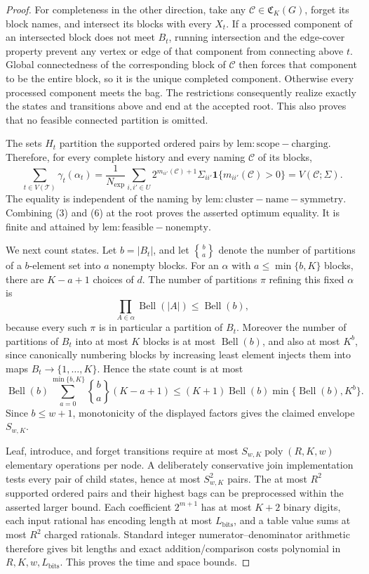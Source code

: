\documentclass{article}
\begin{document}
\begin{proof}
For completeness in the other direction, take any \(\mathcal C\in\mathfrak C_K(G)\), forget its block names, and intersect its blocks with every \(X_t\).  If a processed component of an intersected block does not meet \(B_t\), running intersection and the edge-cover property prevent any vertex or edge of that component from connecting above \(t\).  Global connectedness of the corresponding block of \(\mathcal C\) then forces that component to be the entire block, so it is the unique completed component.  Otherwise every processed component meets the bag.  The restrictions consequently realize exactly the states and transitions above and end at the accepted root.  This also proves that no feasible connected partition is omitted.

The sets \(H_t\) partition the supported ordered pairs by \(\mathrm{lem:scope-charging}\).  Therefore, for every complete history and every naming \(\mathcal C\) of its blocks,
\[
 \sum_{t\in V(\mathcal T)}\gamma_t(\alpha_t)
 =\frac{1}{N_{\exp}}\sum_{i,i'\in U}
 2^{m_{ii'}(\mathcal C)+1}\Sigma_{ii'}
 \mathbf 1\{m_{ii'}(\mathcal C)>0\}
 =V(\mathcal C;\Sigma).
\tag{6}
\]
The equality is independent of the naming by \(\mathrm{lem:cluster-name-symmetry}\).  Combining (3) and (6) at the root proves the asserted optimum equality.  It is finite and attained by \(\mathrm{lem:feasible-nonempty}\).

We next count states.  Let \(b=|B_t|\), and let \(\genfrac{\{} {\}}{0pt}{}{b}{a}\) denote the number of partitions of a \(b\)-element set into \(a\) nonempty blocks.  For an \(\alpha\) with \(a\le\min\{b,K\}\) blocks, there are \(K-a+1\) choices of \(d\).  The number of partitions \(\pi\) refining this fixed \(\alpha\) is
\[
 \prod_{A\in\alpha}\operatorname{Bell}(|A|)\le\operatorname{Bell}(b),
\]
because every such \(\pi\) is in particular a partition of \(B_t\).  Moreover the number of partitions of \(B_t\) into at most \(K\) blocks is at most \(\operatorname{Bell}(b)\), and also at most \(K^b\), since canonically numbering blocks by increasing least element injects them into maps \(B_t\to\{1,\ldots,K\}\).  Hence the state count is at most
\[
 \operatorname{Bell}(b)
 \sum_{a=0}^{\min\{b,K\}}
 \genfrac{\{} {\}}{0pt}{}{b}{a}(K-a+1)
 \le (K+1)\operatorname{Bell}(b)
       \min\{\operatorname{Bell}(b),K^b\}.
\tag{7}
\]
Since \(b\le w+1\), monotonicity of the displayed factors gives the claimed envelope \(S_{w,K}\).

Leaf, introduce, and forget transitions require at most \(S_{w,K}\operatorname{poly}(R,K,w)\) elementary operations per node.  A deliberately conservative join implementation tests every pair of child states, hence at most \(S_{w,K}^2\) pairs.  The at most \(R^2\) supported ordered pairs and their highest bags can be preprocessed within the asserted larger bound.  Each coefficient \(2^{m+1}\) has at most \(K+2\) binary digits, each input rational has encoding length at most \(L_{\mathrm{bits}}\), and a table value sums at most \(R^2\) charged rationals.  Standard integer numerator--denominator arithmetic therefore gives bit lengths and exact addition/comparison costs polynomial in \(R,K,w,L_{\mathrm{bits}}\).  This proves the time and space bounds.


\end{proof}
\end{document}
